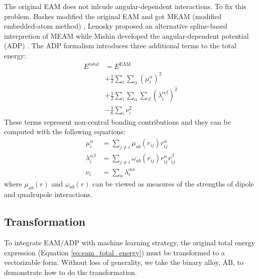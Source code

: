 \documentclass[prb,reprint,superscriptaddress]{revtex4-2}
\begin{document}
The original EAM does not inlcude angular-dependent interactions. To 
fix this problem, Baskes modified the original EAM and got MEAM (modified 
embedded-atom method) \cite{MEAM0}, Lenosky proposed an alternative spline-based 
interpretion of MEAM \cite{MEAM_Lenosky} while Mishin developed the 
angular-dependent potential (ADP) \cite{ADP0,ADP1,ADP2,ADP3,ADP4}. The ADP 
formalism introduces three additional terms to the total energy:
\begin{align}
\label{eq:adp}
E^{total} 
& = E^{\mathrm{EAM}} \nonumber \\
& + \frac{1}{2}\sum_{i}{\sum_{\alpha}{(\mu_{i}^{\alpha})^2}} \nonumber \\
& + \frac{1}{2}\sum_{i}{
    \sum_{\alpha}{\sum_{\beta}{(\lambda_{i}^{\alpha\beta})^2}}} \nonumber \\
& - \frac{1}{6}\sum_{i}{\nu_{i}^{2}}
\end{align}
These terms represent non-central bonding contributions and they can be computed
with the following equations:
\begin{align}
\label{eq:adp_mu}
\mu_{i}^{\alpha} & = \sum_{j \neq i}{\mu_{ab}(r_{ij}) r_{ij}^{\alpha}} \\
\label{eq:adp_lambda}
\lambda_{i}^{\alpha\beta} & = \sum_{j \neq i}{
    \omega_{ab}(r_{ij}) r_{ij}^{\alpha}r_{ij}^{\beta}} \\
\label{eq:adp_nu}
\nu_{i} & = \sum_{\alpha}{\lambda_{i}^{\alpha\alpha}}
\end{align}
where $\mu_{ab}(r)$ and $\omega_{ab}(r)$ can be viewed as measures of the 
strengths of dipole and quadrupole interactions.

\subsection{Transformation}
\label{sec:transformation}

To integrate EAM/ADP with machine learning strategy, the original total energy 
expression (Equation \ref{eq:eam_total_energy}) must be transformed to a 
vectorizable form. Without loss of generality, we take the binary alloy, AB, to 
demonstrate how to do the transformation.

\newcommand{\niaa}{N_{i}^{\mathrm{AA}}}
\newcommand{\niab}{N_{i}^{\mathrm{AB}}}
\newcommand{\njbb}{N_{j}^{\mathrm{BB}}}
\newcommand{\njba}{N_{j}^{\mathrm{BA}}}
\newcommand{\riaa}{\vec{\mathbf{r}}_{i}^{\mathrm{AA}}}
\newcommand{\riab}{\vec{\mathbf{r}}_{i}^{\mathrm{AB}}}
\newcommand{\ribb}{\vec{\mathbf{r}}_{i}^{\mathrm{BB}}}
\newcommand{\riba}{\vec{\mathbf{r}}_{i}^{\mathrm{BA}}}
\newcommand{\namax}{N_{\mathrm{A}}^{\mathrm{max}}}
\newcommand{\nbmax}{N_{\mathrm{B}}^{\mathrm{max}}}
\newcommand{\nnl}{N^{\mathrm{nl}}}
\newcommand{\nnli}{N^{\mathrm{nl}}_i}
\end{document}
